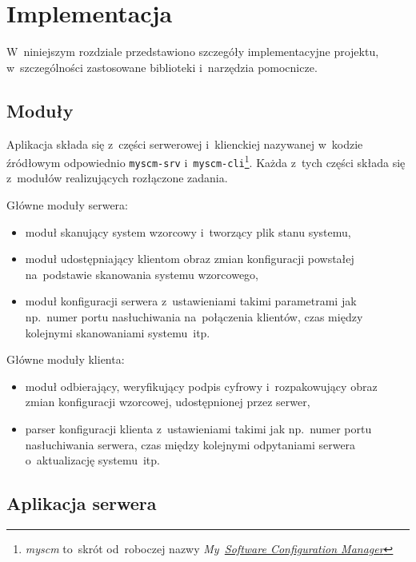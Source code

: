 \documentclass[thesis]{subfiles}
\begin{document}
\chapter{Implementacja}

W~niniejszym rozdziale przedstawiono szczegóły implementacyjne projektu, w~szczególności zastosowane biblioteki i~narzędzia pomocnicze.


\section{Moduły}

Aplikacja składa się z~części serwerowej i~klienckiej nazywanej w~kodzie źródłowym odpowiednio \texttt{myscm-srv} i~\texttt{myscm-cli}\footnote{\emph{myscm} to~skrót od~roboczej nazwy \emph{My~\href{https://en.wikipedia.org/wiki/Software_configuration_management}{Software Configuration Manager}}}. Każda z~tych części składa się z~modułów realizujących rozłączone zadania.

Główne moduły serwera:\mynobreakpar
\begin{itemize}
	\item moduł skanujący system wzorcowy i~tworzący plik stanu systemu,
	\item moduł udostępniający klientom obraz zmian konfiguracji powstałej na~podstawie skanowania systemu wzorcowego,
	\item moduł konfiguracji serwera z~ustawieniami takimi parametrami jak np.~numer portu nasłuchiwania na~połączenia klientów, czas między kolejnymi skanowaniami systemu~itp.
\end{itemize}

Główne moduły klienta:\mynobreakpar
\begin{itemize}
	\item moduł odbierający, weryfikujący podpis cyfrowy i~rozpakowujący obraz zmian konfiguracji wzorcowej, udostępnionej przez serwer,
	\item parser konfiguracji klienta z~ustawieniami takimi jak np.~numer portu nasłuchiwania serwera, czas między kolejnymi odpytaniami serwera o~aktualizację systemu~itp.
\end{itemize}


\section{Aplikacja serwera}
\end{document}
